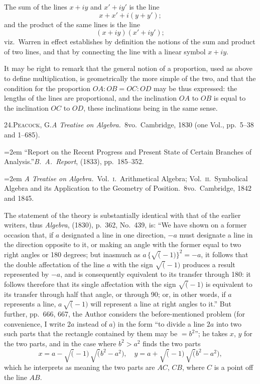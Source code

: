 \documentclass[11pt]{article}
\begin{document}
The sum of the lines $x + iy$ and $x' + iy'$ is the line
\[
x + x' + i(y + y');
\]
and the product of the same lines is the line
\[
(x + iy)(x' + iy');
\]
viz.\ Warren in effect establishes by definition the notions of the sum and product of two lines, and that by connecting the line with a linear symbol $x + iy$.

It may be right to remark that the general notion of a proportion, used as above to define multiplication, is geometrically the more simple of the two, and that the condition for the proportion $OA : OB = OC : OD$ may be thus expressed: the lengths of the lines are proportional, and the inclination $OA$ to $OB$ is equal to the inclination $OC$ to $OD$, these inclinations being in the same sense.

24.\quad \textsc{Peacock, G.}\quad \textit{A Treatise on Algebra.}\ 8vo.\ Cambridge, 1830 (one Vol., pp.~5--38 and 1--685).

\hangindent=2em ``Report on the Recent Progress and Present State of Certain Branches of Analysis.''\quad \textit{B.~A.\ Report}, (1833), pp.~185--352.

\hangindent=2em \textit{A Treatise on Algebra.}\ Vol.~\textsc{i}.\ Arithmetical Algebra; Vol.~\textsc{ii}.\ Symbolical Algebra and its Application to the Geometry of Position.\ 8vo.\ Cambridge, 1842 and 1845.

The statement of the theory is substantially identical with that of the earlier writers, thus \textit{Algebra}, (1830), p.~362, No.~439, is: ``We have shown on a former occasion that, if $a$ designated a line in one direction, $-a$ must designate a line in the direction opposite to it, or making an angle with the former equal to two right angles or 180 degrees; but inasmuch as $a\,\{\surd(-1)\}^{2} = -a$, it follows that the double affectation of the line $a$ with the sign $\surd(-1)$ produces a result represented by $-a$, and is consequently equivalent to its transfer through 180\textdegree: it follows therefore that its single affectation with the sign $\surd(-1)$ is equivalent to its transfer through half that angle, or through 90\textdegree; or, in other words, if $a$ represents a line, $a\,\surd(-1)$ will represent a line at right angles to it.'' But further, pp.~666, 667, the Author considers the before-mentioned problem (for convenience, I write $2a$ instead of $a$) in the form ``to divide a line $2a$ into two such parts that the rectangle contained by them may be $= b^{2}$''; he takes $x$, $y$ for the two parts, and in the case where $b^{2} > a^{2}$ finds the two parts
\[
x = a - \surd(-1)\,\surd(b^{2} - a^{2}),\quad y = a + \surd(-1)\,\surd(b^{2} - a^{2}),
\]
which he interprets as meaning the two parts are $AC$, $CB$, where $C$ is a point off the line $AB$.
\end{document}
